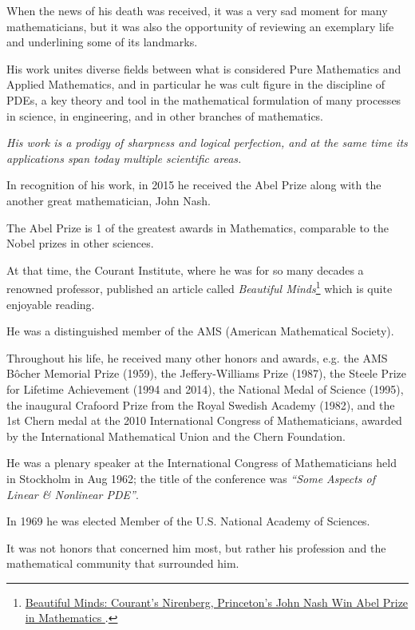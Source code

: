 \documentclass{article}
\begin{document}
%
When the news of his death was received, it was a very sad moment for many mathematicians, but it was also the opportunity of reviewing an exemplary life and underlining some of its landmarks.

His work unites diverse fields between what is considered Pure Mathematics and Applied Mathematics, and in particular he was cult figure in the discipline of PDEs, a key theory and tool in the mathematical formulation of many processes in science, in engineering, and in other branches of mathematics.

\textit{His work is a prodigy of sharpness and logical perfection, and at the same time its applications span today multiple scientific areas.}

%
In recognition of his work, in 2015 he received the Abel Prize along with the another great mathematician, John Nash.

The Abel Prize is 1 of the greatest awards in Mathematics, comparable to the Nobel prizes in other sciences.

At that time, the Courant Institute, where he was for so many decades a renowned professor, published an article called \textit{Beautiful Minds}\footnote{\href{https://www.nyu.edu/about/news-publications/news/2015/march/beautiful-minds-courantsnirenberg-princetons-john-nash-win-abel-prize-in-mathematics-.html}{Beautiful Minds: Courant's Nirenberg, Princeton's John Nash Win Abel Prize in Mathematics }.} which is quite enjoyable reading.

%
He was a distinguished member of the AMS (American Mathematical Society).

Throughout his life, he received many other honors and awards, e.g. the AMS B\^ocher Memorial Prize (1959), the Jeffery-Williams Prize (1987), the Steele Prize for Lifetime Achievement (1994 and 2014), the National Medal of Science (1995), the inaugural Crafoord Prize from the Royal Swedish Academy (1982), and the 1st Chern medal at the 2010 International Congress of Mathematicians, awarded by the International Mathematical Union and the Chern Foundation.

He was a plenary speaker at the International Congress of Mathematicians held in Stockholm in Aug 1962; the title of the conference was \textit{``Some Aspects of Linear \& Nonlinear PDE''}.

In 1969 he was elected Member of the U.S. National Academy of Sciences.

%
It was not honors that concerned him most, but rather his profession and the mathematical community that surrounded him.
\end{document}
